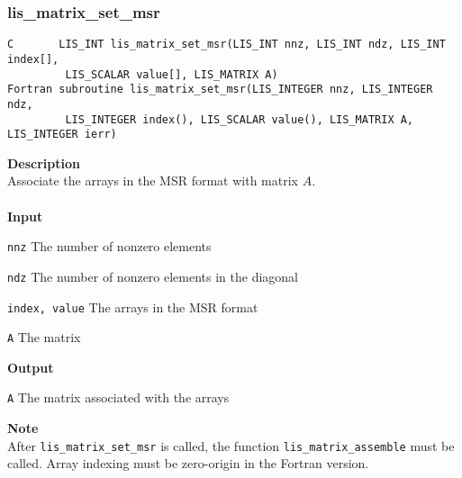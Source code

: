 \documentclass[a4paper]{article}
\newcommand{\namelistlabel}[1]{\mbox{#1}\hfill}
\newenvironment{namelist}[1]{%
\begin{list}{}
  {\let\makelabel\namelistlabel
  \settowidth{\labelwidth}{#1}
  \setlength{\leftmargin}{1.1\labelwidth}}
  }{%
\end{list}}
\begin{document}
\subsubsection{lis\_matrix\_set\_msr}
\begin{screen}
\verb|C       LIS_INT lis_matrix_set_msr(LIS_INT nnz, LIS_INT ndz, LIS_INT index[],|\\
\verb|         LIS_SCALAR value[], LIS_MATRIX A)| \\
\verb|Fortran subroutine lis_matrix_set_msr(LIS_INTEGER nnz, LIS_INTEGER ndz,|\\
\verb|         LIS_INTEGER index(), LIS_SCALAR value(), LIS_MATRIX A, LIS_INTEGER ierr)|
\end{screen}
{\bf Description}\\
\indent
Associate the arrays in the MSR format with matrix $A$.
\\ \\
\noindent
{\bf Input}
\begin{namelist}{XXXXXXXXXXXXXXXXXXXX}
\item[\tt nnz] The number of nonzero elements
\item[\tt ndz] The number of nonzero elements in the diagonal
\item[\tt index, value] The arrays in the MSR format
\item[\tt A] The matrix
\end{namelist}
{\bf Output}
\begin{namelist}{XXXXXXXXXXXXXXXXXXXX}
\item[\tt A] The matrix associated with the arrays
\end{namelist}
\noindent
{\bf Note}\\
\indent
After \verb|lis_matrix_set_msr| is called, 
the function \verb|lis_matrix_assemble| must be called. 
Array indexing must be zero-origin in the Fortran version.
\end{document}
